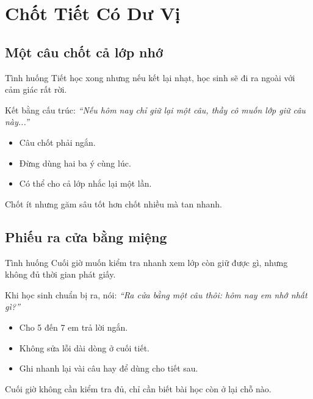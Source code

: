 \chapter{Chốt Tiết Có Dư Vị}

\section{Một câu chốt cả lớp nhớ}
\begin{tinhhuong}{Tình huống}
Tiết học xong nhưng nếu kết lại nhạt, học sinh sẽ đi ra ngoài với cảm giác rất rời.
\end{tinhhuong}
\begin{goiydungngay}
Kết bằng cấu trúc: \textit{``Nếu hôm nay chỉ giữ lại một câu, thầy cô muốn lớp giữ câu này...''}
\begin{itemize}
\item Câu chốt phải ngắn.
\item Đừng dùng hai ba ý cùng lúc.
\item Có thể cho cả lớp nhắc lại một lần.
\end{itemize}
\end{goiydungngay}
\begin{cauchot}
Chốt ít nhưng găm sâu tốt hơn chốt nhiều mà tan nhanh.
\end{cauchot}
\ngancach

\section{Phiếu ra cửa bằng miệng}
\begin{tinhhuong}{Tình huống}
Cuối giờ muốn kiểm tra nhanh xem lớp còn giữ được gì, nhưng không đủ thời gian phát giấy.
\end{tinhhuong}
\begin{goiydungngay}
Khi học sinh chuẩn bị ra, nói: \textit{``Ra cửa bằng một câu thôi: hôm nay em nhớ nhất gì?''}
\begin{itemize}
\item Cho 5 đến 7 em trả lời ngắn.
\item Không sửa lỗi dài dòng ở cuối tiết.
\item Ghi nhanh lại vài câu hay để dùng cho tiết sau.
\end{itemize}
\end{goiydungngay}
\begin{cauchot}
Cuối giờ không cần kiểm tra đủ, chỉ cần biết bài học còn ở lại chỗ nào.
\end{cauchot}
\ngancach

